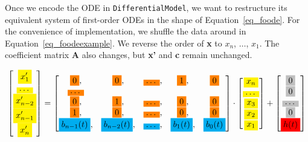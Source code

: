 Once we encode the ODE in \verb|DifferentialModel|, we want to restructure its equivalent system of first-order ODEs in the shape of Equation~\ref{eq_foode}. For the convenience of implementation, we shuffle the data around in Equation~\ref{eq_foodeexample}. We reverse the order of \textbf{x} to $x_{n}$, $\dots$, $x_{1}$. The coefficient matrix \textbf{A} also changes, but \textbf{x'} and \textbf{c} remain unchanged.

\begin{equation} \label{eq_foodeexamplecolor}
	\begin{bmatrix}
		\highlight{yellow}{x_{1}'} \\
    \highlight{yellow}{\dots} \\
    \highlight{yellow}{x_{n-2}'} \\
    \highlight{yellow}{x_{n-1}'} \\
    \highlight{yellow}{x_{n}'}
	\end{bmatrix}
    = 
  \begin{bmatrix}
		\highlight{orange}{0}, & \highlight{orange}{0}, & \highlight{orange}{\dots}, & \highlight{orange}{1}, & \highlight{orange}{0} \\
    \highlight{orange}{\dots} \\
    \highlight{orange}{0}, & \highlight{orange}{1}, & \highlight{orange}{\dots}, & \highlight{orange}{0}, & \highlight{orange}{0} \\
    \highlight{orange}{1}, & \highlight{orange}{0}, & \highlight{orange}{\dots}, & \highlight{orange}{0}, & \highlight{orange}{0} \\
    \highlight{cyan}{b_{n-1}(t)}, & \highlight{cyan}{b_{n-2}(t)}, & \highlight{cyan}{\dots}, & \highlight{cyan}{b_{1}(t)}, & \highlight{cyan}{b_{0}(t)}
	\end{bmatrix}
    \cdot
  \begin{bmatrix}
    \highlight{yellow}{x_{n}} \\
    \highlight{yellow}{\dots} \\
    \highlight{yellow}{x_{3}} \\
		\highlight{yellow}{x_{2}} \\
    \highlight{yellow}{x_{1}}
	\end{bmatrix}
    + 
  \begin{bmatrix}
    \highlight{lightgray}{0} \\
    \highlight{lightgray}{0} \\
    \highlight{lightgray}{\dots} \\
    \highlight{lightgray}{0} \\
    \highlight{red}{h(t)}
	\end{bmatrix}
\end{equation}

